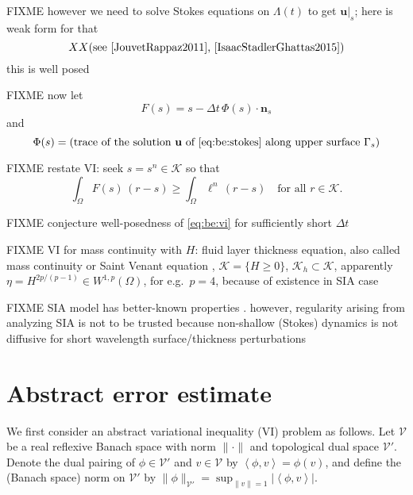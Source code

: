 \documentclass[hidelinks,onefignum,onetabnum,final]{siamart220329}  %
\newcommand{\bn}{\mathbf{n}}
\newcommand{\bu}{\mathbf{u}}
\newcommand{\cK}{\mathcal{K}}
\newcommand{\cV}{\mathcal{V}}
\newcommand{\ip}[2]{\left<#1,#2\right>}
\begin{document}
FIXME however we need to solve Stokes equations on $\Lambda(t)$ to get $\bu|_s$; here is weak form for that
\begin{equation}
XX \text{(see \cite{JouvetRappaz2011}, \cite{IsaacStadlerGhattas2015})} \label{eq:be:stokes}
\end{equation}
this is well posed \cite{JouvetRappaz2011}

FIXME now let
\begin{equation}
F(s) = s - \Delta t\,\Phi(s) \cdot \bn_s  \label{eq:be:Fdefine}
\end{equation}
and
\begin{equation}
\Phi(s) = \left(\text{trace of the solution $\bu$ of \eqref{eq:be:stokes} along upper surface $\Gamma_s$}\right)  \label{eq:be:Phidefine}
\end{equation}

FIXME restate VI: seek $s = s^n \in \cK$ so that 
\begin{equation}
\int_\Omega F(s)\,(r-s) \ge \int_\Omega \ell^n \,(r-s) \quad \text{for all } r \in \cK. \label{eq:be:vi}
\end{equation}

FIXME conjecture well-posedness of \eqref{eq:be:vi} for sufficiently short $\Delta t$

FIXME VI for mass continuity with $H$: fluid layer thickness equation, also called mass continuity or Saint Venant equation \cite{JouvetBueler2012}, $\cK = \{H\ge 0\}$, $\cK_h \subset \cK$, apparently $\eta = H^{2p/(p-1)} \in W^{1,p}(\Omega)$, for e.g.~$p=4$, because of existence in SIA case \cite{JouvetBueler2012}

FIXME SIA model has better-known properties \cite{JouvetBueler2012,PiersantiTemam2023}. however, regularity arising from analyzing SIA is not to be trusted because non-shallow (Stokes) dynamics is not diffusive for short wavelength surface/thickness perturbations \cite{Pattynetal2008}


\section{Abstract error estimate} \label{sec:abstractestimate}

We first consider an abstract variational inequality (VI) \cite{KinderlehrerStampacchia1980} problem as follows.  Let $\cV$ be a real reflexive Banach space with norm $\|\cdot\|$ and topological dual space $\cV'$.  Denote the dual pairing of $\phi \in \cV'$ and $v\in\cV$ by $\ip{\phi}{v} = \phi(v)$, and define the (Banach space) norm on $\cV'$ by $\|\phi\|_{\cV'} = \sup_{\|v\|=1} |\!\ip{\phi}{v}\!|$.
\end{document}
